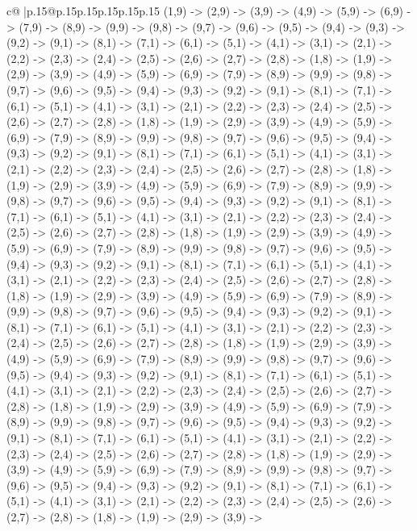 \documentclass{article}
\begin{document}
{\begin{supertabular}{c@{$\;$}|p{.15\linewidth}@{}p{.15\linewidth}p{.15\linewidth}p{.15\linewidth}p{.15\linewidth}p{.15\linewidth}}
{{{(1,9) {-}> (2,9) {-}> (3,9) {-}> (4,9) {-}> (5,9) {-}> (6,9) {-}> (7,9) {-}> (8,9) {-}> (9,9) {-}> (9,8) {-}> (9,7) {-}> (9,6) {-}> (9,5) {-}> (9,4) {-}> (9,3) {-}> (9,2) {-}> (9,1) {-}> (8,1) {-}> (7,1) {-}> (6,1) {-}> (5,1) {-}> (4,1) {-}> (3,1) {-}> (2,1) {-}> (2,2) {-}> (2,3) {-}> (2,4) {-}> (2,5) {-}> (2,6) {-}> (2,7) {-}> (2,8) {-}> (1,8) {-}> (1,9) {-}> (2,9) {-}> (3,9) {-}> (4,9) {-}> (5,9) {-}> (6,9) {-}> (7,9) {-}> (8,9) {-}> (9,9) {-}> (9,8) {-}> (9,7) {-}> (9,6) {-}> (9,5) {-}> (9,4) {-}> (9,3) {-}> (9,2) {-}> (9,1) {-}> (8,1) {-}> (7,1) {-}> (6,1) {-}> (5,1) {-}> (4,1) {-}> (3,1) {-}> (2,1) {-}> (2,2) {-}> (2,3) {-}> (2,4) {-}> (2,5) {-}> (2,6) {-}> (2,7) {-}> (2,8) {-}> (1,8) {-}> (1,9) {-}> (2,9) {-}> (3,9) {-}> (4,9) {-}> (5,9) {-}> (6,9) {-}> (7,9) {-}> (8,9) {-}> (9,9) {-}> (9,8) {-}> (9,7) {-}> (9,6) {-}> (9,5) {-}> (9,4) {-}> (9,3) {-}> (9,2) {-}> (9,1) {-}> (8,1) {-}> (7,1) {-}> (6,1) {-}> (5,1) {-}> (4,1) {-}> (3,1) {-}> (2,1) {-}> (2,2) {-}> (2,3) {-}> (2,4) {-}> (2,5) {-}> (2,6) {-}> (2,7) {-}> (2,8) {-}> (1,8) {-}> (1,9) {-}> (2,9) {-}> (3,9) {-}> (4,9) {-}> (5,9) {-}> (6,9) {-}> (7,9) {-}> (8,9) {-}> (9,9) {-}> (9,8) {-}> (9,7) {-}> (9,6) {-}> (9,5) {-}> (9,4) {-}> (9,3) {-}> (9,2) {-}> (9,1) {-}> (8,1) {-}> (7,1) {-}> (6,1) {-}> (5,1) {-}> (4,1) {-}> (3,1) {-}> (2,1) {-}> (2,2) {-}> (2,3) {-}> (2,4) {-}> (2,5) {-}> (2,6) {-}> (2,7) {-}> (2,8) {-}> (1,8) {-}> (1,9) {-}> (2,9) {-}> (3,9) {-}> (4,9) {-}> (5,9) {-}> (6,9) {-}> (7,9) {-}> (8,9) {-}> (9,9) {-}> (9,8) {-}> (9,7) {-}> (9,6) {-}> (9,5) {-}> (9,4) {-}> (9,3) {-}> (9,2) {-}> (9,1) {-}> (8,1) {-}> (7,1) {-}> (6,1) {-}> (5,1) {-}> (4,1) {-}> (3,1) {-}> (2,1) {-}> (2,2) {-}> (2,3) {-}> (2,4) {-}> (2,5) {-}> (2,6) {-}> (2,7) {-}> (2,8) {-}> (1,8) {-}> (1,9) {-}> (2,9) {-}> (3,9) {-}> (4,9) {-}> (5,9) {-}> (6,9) {-}> (7,9) {-}> (8,9) {-}> (9,9) {-}> (9,8) {-}> (9,7) {-}> (9,6) {-}> (9,5) {-}> (9,4) {-}> (9,3) {-}> (9,2) {-}> (9,1) {-}> (8,1) {-}> (7,1) {-}> (6,1) {-}> (5,1) {-}> (4,1) {-}> (3,1) {-}> (2,1) {-}> (2,2) {-}> (2,3) {-}> (2,4) {-}> (2,5) {-}> (2,6) {-}> (2,7) {-}> (2,8) {-}> (1,8) {-}> (1,9) {-}> (2,9) {-}> (3,9) {-}> (4,9) {-}> (5,9) {-}> (6,9) {-}> (7,9) {-}> (8,9) {-}> (9,9) {-}> (9,8) {-}> (9,7) {-}> (9,6) {-}> (9,5) {-}> (9,4) {-}> (9,3) {-}> (9,2) {-}> (9,1) {-}> (8,1) {-}> (7,1) {-}> (6,1) {-}> (5,1) {-}> (4,1) {-}> (3,1) {-}> (2,1) {-}> (2,2) {-}> (2,3) {-}> (2,4) {-}> (2,5) {-}> (2,6) {-}> (2,7) {-}> (2,8) {-}> (1,8) {-}> (1,9) {-}> (2,9) {-}> (3,9) {-}> (4,9) {-}> (5,9) {-}> (6,9) {-}> (7,9) {-}> (8,9) {-}> (9,9) {-}> (9,8) {-}> (9,7) {-}> (9,6) {-}> (9,5) {-}> (9,4) {-}> (9,3) {-}> (9,2) {-}> (9,1) {-}> (8,1) {-}> (7,1) {-}> (6,1) {-}> (5,1) {-}> (4,1) {-}> (3,1) {-}> (2,1) {-}> (2,2) {-}> (2,3) {-}> (2,4) {-}> (2,5) {-}> (2,6) {-}> (2,7) {-}> (2,8) {-}> (1,8) {-}> (1,9) {-}> (2,9) {-}> (3,9) {-}> (4,9) {-}> (5,9) {-}> (6,9) {-}> (7,9) {-}> (8,9) {-}> (9,9) {-}> (9,8) {-}> (9,7) {-}> (9,6) {-}> (9,5) {-}> (9,4) {-}> (9,3) {-}> (9,2) {-}> (9,1) {-}> (8,1) {-}> (7,1) {-}> (6,1) {-}> (5,1) {-}> (4,1) {-}> (3,1) {-}> (2,1) {-}> (2,2) {-}> (2,3) {-}> (2,4) {-}> (2,5) {-}> (2,6) {-}> (2,7) {-}> (2,8) {-}> (1,8) {-}> (1,9) {-}> (2,9) {-}> (3,9) {-}> }}}
\end{supertabular}}
\end{document}
